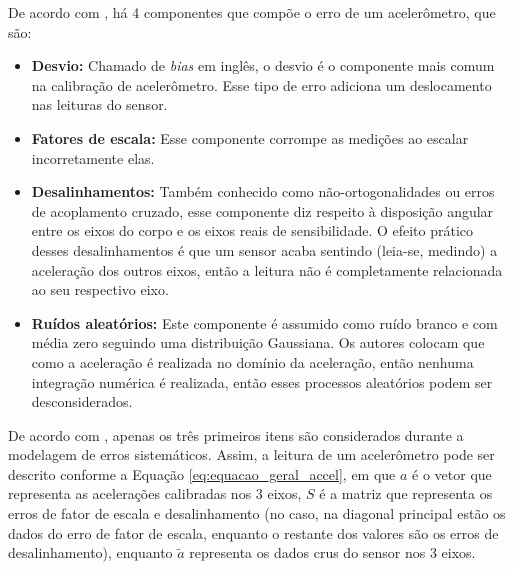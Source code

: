 \documentclass[acronym, symbols, table]{fei}
\begin{document}
			De acordo com \textcite{menezes2020triaxial}, há 4 componentes que compõe o erro de um acelerômetro, que são:
			
			\begin{itemize}
				\item \textbf{Desvio:} Chamado de \textit{bias} em inglês, o desvio é o componente mais comum na calibração de acelerômetro. Esse tipo de erro adiciona um deslocamento nas leituras do sensor.
				
				\item \textbf{Fatores de escala:} Esse componente corrompe as medições ao escalar incorretamente elas.
				
				\item \textbf{Desalinhamentos:} Também conhecido como não-ortogonalidades ou erros de acoplamento cruzado, esse componente diz respeito à disposição angular entre os eixos do corpo e os eixos reais de sensibilidade. O efeito prático desses desalinhamentos é que um sensor acaba sentindo (leia-se, medindo) a aceleração dos outros eixos, então a leitura não é completamente relacionada ao seu respectivo eixo.
				
				\item \textbf{Ruídos aleatórios:} Este componente é assumido como ruído branco e com média zero seguindo uma distribuição Gaussiana. Os autores colocam que como a aceleração é realizada no domínio da aceleração, então nenhuma integração numérica é realizada, então esses processos aleatórios podem ser desconsiderados.
			\end{itemize}
			
			De acordo com \textcite{hassan2020field}, apenas os três primeiros itens são considerados durante a modelagem de erros sistemáticos. Assim, a leitura de um acelerômetro pode ser descrito conforme a Equação \ref{eq:equacao_geral_accel}, em que $a$ é o vetor que representa as acelerações calibradas nos 3 eixos, $S$ é a matriz que representa os erros de fator de escala e desalinhamento (no caso, na diagonal principal estão os dados do erro de fator de escala, enquanto o restante dos valores são os erros de desalinhamento), enquanto $\tilde{a}$ representa os dados crus do sensor nos 3 eixos.
			
\end{document}
